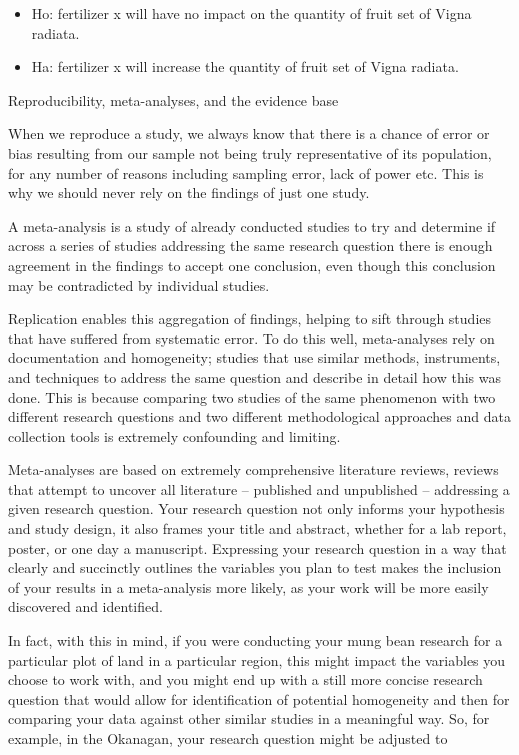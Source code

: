 \documentclass[
]{book}
\providecommand{\tightlist}{%
  \setlength{\itemsep}{0pt}\setlength{\parskip}{0pt}}
\begin{document}
\begin{itemize}
\tightlist
\item
  Ho: fertilizer x will have no impact on the quantity of fruit set of Vigna radiata.
\item
  Ha: fertilizer x will increase the quantity of fruit set of Vigna radiata.
\end{itemize}

Reproducibility, meta-analyses, and the evidence base

When we reproduce a study, we always know that there is a chance of error or bias resulting from our sample not being truly representative of its population, for any number of reasons including sampling error, lack of power etc. This is why we should never rely on the findings of just one study.

A meta-analysis is a study of already conducted studies to try and determine if across a series of studies addressing the same research question there is enough agreement in the findings to accept one conclusion, even though this conclusion may be contradicted by individual studies.

Replication enables this aggregation of findings, helping to sift through studies that have suffered from systematic error. To do this well, meta-analyses rely on documentation and homogeneity; studies that use similar methods, instruments, and techniques to address the same question and describe in detail how this was done. This is because comparing two studies of the same phenomenon with two different research questions and two different methodological approaches and data collection tools is extremely confounding and limiting.

Meta-analyses are based on extremely comprehensive literature reviews, reviews that attempt to uncover all literature -- published and unpublished -- addressing a given research question. Your research question not only informs your hypothesis and study design, it also frames your title and abstract, whether for a lab report, poster, or one day a manuscript. Expressing your research question in a way that clearly and succinctly outlines the variables you plan to test makes the inclusion of your results in a meta-analysis more likely, as your work will be more easily discovered and identified.

In fact, with this in mind, if you were conducting your mung bean research for a particular plot of land in a particular region, this might impact the variables you choose to work with, and you might end up with a still more concise research question that would allow for identification of potential homogeneity and then for comparing your data against other similar studies in a meaningful way. So, for example, in the Okanagan, your research question might be adjusted to
\end{document}
